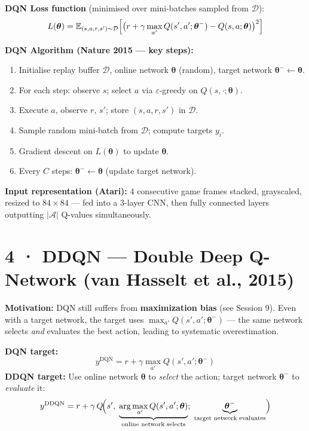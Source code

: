 \documentclass[11pt,a4paper]{article}
\begin{document}
\textbf{DQN Loss function} (minimised over mini-batches sampled from $\mathcal{D}$):
\[
  L(\boldsymbol{\theta}) = \mathbb{E}_{(s,a,r,s') \sim \mathcal{D}}\Bigl[\bigl(r + \gamma\max_{a'} Q(s',a';\boldsymbol{\theta}^{-}) - Q(s,a;\boldsymbol{\theta})\bigr)^2\Bigr]
\]

\textbf{DQN Algorithm (Nature 2015 — key steps):}
\begin{enumerate}
  \item Initialise replay buffer $\mathcal{D}$, online network $\boldsymbol{\theta}$ (random), target network $\boldsymbol{\theta}^{-} \leftarrow \boldsymbol{\theta}$.
  \item For each step: observe $s$; select $a$ via $\varepsilon$-greedy on $Q(s,\cdot;\boldsymbol{\theta})$.
  \item Execute $a$, observe $r$, $s'$; store $(s,a,r,s')$ in $\mathcal{D}$.
  \item Sample random mini-batch from $\mathcal{D}$; compute targets $y_i$.
  \item Gradient descent on $L(\boldsymbol{\theta})$ to update $\boldsymbol{\theta}$.
  \item Every $C$ steps: $\boldsymbol{\theta}^{-} \leftarrow \boldsymbol{\theta}$ (update target network).
\end{enumerate}

\textbf{Input representation (Atari):} 4 consecutive game frames stacked, grayscaled, resized to $84\times84$ — fed into a 3-layer CNN, then fully connected layers outputting $|\mathcal{A}|$ Q-values simultaneously.

\section*{4 · DDQN — Double Deep Q-Network (van Hasselt et al., 2015)}

\textbf{Motivation:} DQN still suffers from \textbf{maximization bias} (see Session 9).
Even with a target network, the target uses $\max_{a'} Q(s',a';\boldsymbol{\theta}^{-})$ — the
same network selects \emph{and} evaluates the best action, leading to systematic overestimation.

\begin{tcolorbox}[bold={DDQN Fix — Decouple Action Selection from Evaluation}]
\textbf{DQN target:}
\[
  y^{\text{DQN}} = r + \gamma \max_{a'} Q(s',a';\boldsymbol{\theta}^{-})
\]
\textbf{DDQN target:} Use online network $\boldsymbol{\theta}$ to \emph{select} the action;
target network $\boldsymbol{\theta}^{-}$ to \emph{evaluate} it:
\[
  y^{\text{DDQN}} = r + \gamma\, Q\!\Bigl(s',\; \underbrace{\arg\max_{a'} Q(s',a';\boldsymbol{\theta})}_{\text{online network selects}};\; \underbrace{\boldsymbol{\theta}^{-}}_{\text{target network evaluates}}\Bigr)
\]
\end{tcolorbox}
\end{document}
